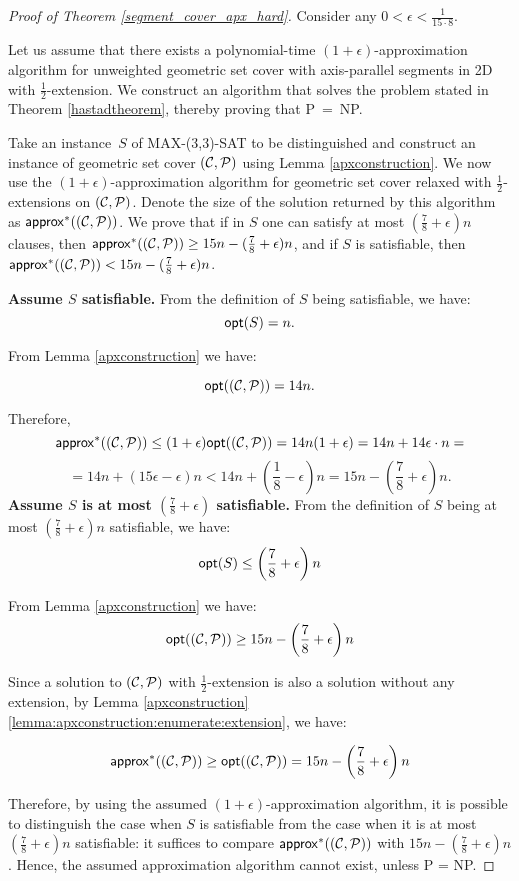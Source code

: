 \begin{proof}[Proof of Theorem \ref{segment_cover_apx_hard}]
Consider any $0 < \epsilon < \frac{1}{15 \cdot 8}$.

Let us assume that there exists a polynomial-time
$(1+\epsilon)$-approximation algorithm
for unweighted geometric set cover with axis-parallel segments in 2D
with $\frac{1}{2}$-extension.
We construct an algorithm that solves the problem stated in 
Theorem \ref{hastadtheorem}, thereby proving that P~=~NP.

Take an instance~$S$ of MAX-(3,3)-SAT to be distinguished
and construct an instance of geometric set cover $(\mathcal{C}, \mathcal{P})$
using Lemma \ref{apxconstruction}.
We now use the $(1+\epsilon)$-approximation algorithm
for geometric set cover relaxed with $\frac{1}{2}$-extensions on $(\mathcal{C}, \mathcal{P})$.
Denote the size of the solution returned by this algorithm as $\mathsf{approx}^{*}((\mathcal{C}, \mathcal{P}))$.
We prove that 
if in $S$
one can satisfy at most $(\frac{7}{8}+\epsilon)n$ clauses,
then $\mathsf{approx}^{*}((\mathcal{C}, \mathcal{P})) \ge 15n - (\frac{7}{8} + \epsilon)n$,
and if $S$ is
satisfiable, then $\mathsf{approx}^{*}((\mathcal{C}, \mathcal{P})) < 15n - (\frac{7}{8} + \epsilon)n$.


\textbf{Assume $S$ satisfiable.}
From the definition of $S$ being satisfiable, we have:
$$\mathsf{opt}(S) = n.$$

From Lemma \ref{apxconstruction} we have:

$$\mathsf{opt}((\mathcal{C}, \mathcal{P})) = 14n.$$

Therefore,
$$\mathsf{approx}^{*}((\mathcal{C}, \mathcal{P})) \le (1+\epsilon)\mathsf{opt}((\mathcal{C}, \mathcal{P})) = 14n(1+\epsilon)
	= 14n + 14\epsilon\cdot n =$$ 
	$$= 14n + (15\epsilon - \epsilon)n < 
  14n + \left(\frac{1}{8} - \epsilon\right)n 
= 15n - \left(\frac{7}{8} + \epsilon\right)n.$$
\textbf{Assume $S$ is at most 
$\left(\frac{7}{8} + \epsilon\right)$ satisfiable.}
From the definition of $S$ being at most 
$\left(\frac{7}{8} + \epsilon\right)n$ satisfiable, we have:
$$\mathsf{opt}(S) \le \left(\frac{7}{8} + \epsilon\right)n$$

From Lemma \ref{apxconstruction} we have:
$$\mathsf{opt}((\mathcal{C}, \mathcal{P})) \ge 15n - \left(\frac{7}{8} + \epsilon\right)n$$

Since a solution to $(\mathcal{C}, \mathcal{P})$ with $\frac{1}{2}$-extension is
also a solution without any extension, by 
Lemma \ref{apxconstruction} \ref{lemma:apxconstruction:enumerate:extension}, we have:

$$\mathsf{approx}^{*}((\mathcal{C}, \mathcal{P})) \ge \mathsf{opt}((\mathcal{C}, \mathcal{P})) = 15n - \left(\frac{7}{8} + \epsilon\right)n$$


Therefore, by using the assumed $(1+\epsilon)$-approximation
algorithm,
it is possible to distinguish the case when
$S$ is satisfiable from the case when it is
at most $(\frac{7}{8} + \epsilon)n$ satisfiable:
it suffices to compare $\mathsf{approx}^{*}((\mathcal{C}, \mathcal{P}))$ with $15n - (\frac{7}{8}+\epsilon)n$.
Hence, the assumed approximation algorithm cannot exist, unless P = NP.
\end{proof}

